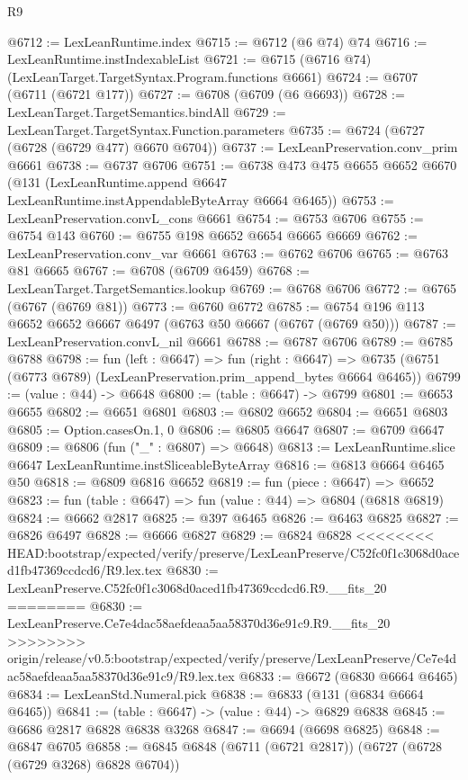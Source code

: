 \begin{lexlean}{R9}
\begin{coremodule}
{{{{{{{{{{{{{{{{{{{{{{{{{{{{{{{{{{{{{{{{{{{{{{{{{{{{{{{{{{{{{{{{{{{{{{{{{{{{{{{{{{{{@6712 := LexLeanRuntime.index
@6715 := @6712 (@6 @74) @74
@6716 := LexLeanRuntime.instIndexableList
@6721 := @6715 (@6716 @74) (LexLeanTarget.TargetSyntax.Program.functions @6661)
@6724 := @6707 (@6711 (@6721 @177))
@6727 := @6708 (@6709 (@6 @6693))
@6728 := LexLeanTarget.TargetSemantics.bindAll
@6729 := LexLeanTarget.TargetSyntax.Function.parameters
@6735 := @6724 (@6727 (@6728 (@6729 @477) @6670 @6704))
@6737 := LexLeanPreservation.conv_prim @6661
@6738 := @6737 @6706
@6751 := @6738
    @473
    @475
    @6655
    @6652
    @6670
    (@131 (LexLeanRuntime.append @6647 LexLeanRuntime.instAppendableByteArray @6664 @6465))
@6753 := LexLeanPreservation.convL_cons @6661
@6754 := @6753 @6706
@6755 := @6754 @143
@6760 := @6755 @198 @6652 @6654 @6665 @6669
@6762 := LexLeanPreservation.conv_var @6661
@6763 := @6762 @6706
@6765 := @6763 @81 @6665
@6767 := @6708 (@6709 @6459)
@6768 := LexLeanTarget.TargetSemantics.lookup
@6769 := @6768 @6706
@6772 := @6765 (@6767 (@6769 @81))
@6773 := @6760 @6772
@6785 := @6754 @196 @113 @6652 @6652 @6667 @6497 (@6763 @50 @6667 (@6767 (@6769 @50)))
@6787 := LexLeanPreservation.convL_nil @6661
@6788 := @6787 @6706
@6789 := @6785 @6788
@6798 := fun (left : @6647) =>
  fun (right : @6647) =>
  @6735 (@6751 (@6773 @6789) (LexLeanPreservation.prim_append_bytes @6664 @6465))
@6799 := (value : @44) -> @6648
@6800 := (table : @6647) -> @6799
@6801 := @6653 @6655
@6802 := @6651 @6801
@6803 := @6802 @6652
@6804 := @6651 @6803
@6805 := Option.casesOn.{1, 0}
@6806 := @6805 @6647
@6807 := @6709 @6647
@6809 := @6806 (fun ("_" : @6807) => @6648)
@6813 := LexLeanRuntime.slice @6647 LexLeanRuntime.instSliceableByteArray
@6816 := @6813 @6664 @6465 @50
@6818 := @6809 @6816 @6652
@6819 := fun (piece : @6647) => @6652
@6823 := fun (table : @6647) => fun (value : @44) => @6804 (@6818 @6819)
@6824 := @6662 @2817
@6825 := @397 @6465
@6826 := @6463 @6825
@6827 := @6826 @6497
@6828 := @6666 @6827
@6829 := @6824 @6828
<<<<<<<< HEAD:bootstrap/expected/verify/preserve/LexLeanPreserve/C52fc0f1c3068d0aced1fb47369ccdcd6/R9.lex.tex
@6830 := LexLeanPreserve.C52fc0f1c3068d0aced1fb47369ccdcd6.R9.__fits_20
========
@6830 := LexLeanPreserve.Ce7e4dac58aefdeaa5aa58370d36e91c9.R9.__fits_20
>>>>>>>> origin/release/v0.5:bootstrap/expected/verify/preserve/LexLeanPreserve/Ce7e4dac58aefdeaa5aa58370d36e91c9/R9.lex.tex
@6833 := @6672 (@6830 @6664 @6465)
@6834 := LexLeanStd.Numeral.pick
@6838 := @6833 (@131 (@6834 @6664 @6465))
@6841 := (table : @6647) -> (value : @44) -> @6829 @6838
@6845 := @6686 @2817 @6828 @6838 @3268
@6847 := @6694 (@6698 @6825)
@6848 := @6847 @6705
@6858 := @6845 @6848 (@6711 (@6721 @2817)) (@6727 (@6728 (@6729 @3268) @6828 @6704))
}}}}}}}}}}}}}}}}}}}}}}}}}}}}}}}}}}}}}}}}}}}}}}}}}}}}}}}}}}}}}}}}}}}}}}}}}}}}}}}}}}}}
\end{coremodule}
\end{lexlean}
